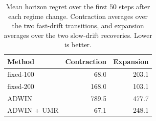 \begin{table}[!htbp]
\centering
\caption{Mean horizon regret over the first 50 steps after each regime change. Contraction averages over the two fast-drift transitions, and expansion averages over the two slow-drift recoveries. Lower is better.}
\label{tab:hysteresis_transition}
\begin{tabular}{lrr}
\toprule
Method & Contraction & Expansion \\
\midrule
fixed-100 & 68.0 & 203.1 \\
fixed-200 & 168.0 & 103.1 \\
ADWIN & 789.5 & 477.7 \\
ADWIN + UMR & 67.1 & 248.1 \\
\bottomrule
\end{tabular}
\end{table}
